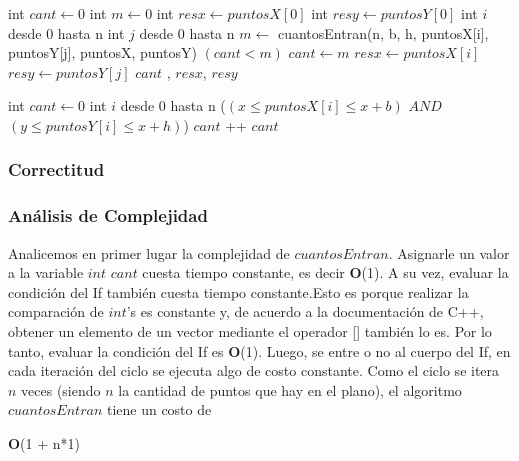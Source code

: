 \begin{algorithm}[H]
\caption{} 
\begin{codebox}
\li int $cant \gets 0$
\li int $m \gets 0$
\li int $resx \gets puntosX[0]$
\li int $resy \gets puntosY[0]$
\li \For int $i$ desde 0 hasta n \Do
\li		\For int $j$ desde 0 hasta n \Do
\li 		$m \gets $ cuantosEntran(n, b, h, puntosX[i], puntosY[j], puntosX, puntosY)
\li 		\If $(cant<m)$ 
\li				\Then   $cant \gets m$
\li 					$resx \gets puntosX[i]$
\li 					$resy \gets puntosY[j]$
				\End
			\End
		\End
	\End
\li \Return $cant$ , $resx$, $resy$

\End
\end{codebox}
\end{algorithm}


\begin{algorithm}[H]
\caption{} 
\begin{codebox}
\li int $cant \gets 0$
\li \For int $i$ desde 0 hasta n \Do
\li 	\If ($(x \leq puntosX[i] \leq x+b)$  $AND$  $(y \leq puntosY[i] \leq x+h)$) \Do
\li 		$cant$ ++		
 		\End
 	\End	
\li \Return $cant $
\End
\end{codebox}
\end{algorithm}

\subsubsection{Correctitud}

\subsubsection{Análisis de Complejidad}

\indent Analicemos en primer lugar la complejidad de $cuantosEntran$. Asignarle un valor a la variable $int$ $cant$ cuesta tiempo constante, es decir \textbf{O}(1). A su vez, evaluar la condición del If también cuesta tiempo constante.Esto es porque realizar la comparaci\'on de $int$'s es constante y, de acuerdo a la documentaci\'on de C++, obtener un elemento de un vector mediante el operador [] tambi\'en lo es. Por lo tanto, evaluar la condición del If es \textbf{O}(1). Luego, se entre o no al cuerpo del If, en cada iteraci\'on del ciclo se ejecuta algo de costo constante. Como el ciclo se itera $n$ veces (siendo $n$ la cantidad de puntos que hay en el plano), el algoritmo $cuantosEntran$ tiene un costo de\\
\begin{center}
\textbf{O}(1 + n*1)
\end{center}\\

